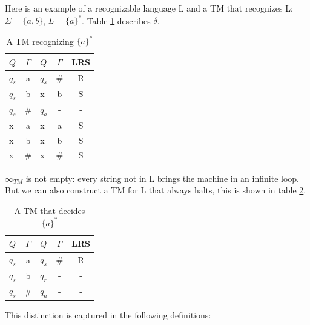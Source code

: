 Here is an example of a recognizable language L and a TM that
recognizes L: $\Sigma = \{a,b\}$, $L = \{a\}^*$. Table \ref{turing3}
describes $\delta$.

\begin{table}[ht]
\center
\begin{tabular}{|l|c||l|c|c|}
\hline
$Q$    & $\Gamma$   &  $Q$  &  $\Gamma$ &  LRS \\ \hline
$q_s$  &  a         &  $q_s$&   \#      &  R   \\ 
$q_s$  &  b         &  x    &    b      &  S   \\ 
$q_s$  &  \#        &  $q_a$&    -      &  -   \\ 
x      &  a         &  x    &    a      &  S   \\ 
x      &  b         &  x    &    b      &  S   \\ 
x      &  \#        &  x    &    \#     &  S   \\ 
\hline
\end{tabular}
\caption{A TM recognizing $\{a\}^*$} \label{turing3}
\end{table}
$\infty_{TM}$ is not empty: every string not in L brings the machine
in an infinite loop. But we can also construct a TM for L that always
halts, this is shown in table \ref{turing4}.

\begin{table}[ht]
\center
\begin{tabular}{|l|c||l|c|c|}
\hline
$Q$    & $\Gamma$   &  $Q$  &  $\Gamma$ &  LRS \\ \hline
$q_s$  &  a         &  $q_s$&   \#      &  R   \\ 
$q_s$  &  b         &  $q_r$&    -      &  -   \\ 
$q_s$  &  \#        &  $q_a$&    -      &  -   \\ 
\hline
\end{tabular}
\caption{A TM that decides $\{a\}^*$} \label{turing4}
\end{table}

This distinction is captured in the following definitions:





